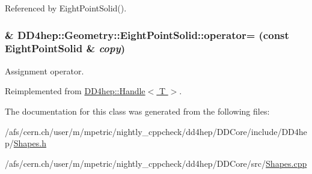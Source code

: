 Referenced by EightPointSolid().\hypertarget{class_d_d4hep_1_1_geometry_1_1_eight_point_solid_aa9fdc9420f5096e3075540a12b79cd2a}{
\subsubsection[{operator=}]{\& DD4hep::Geometry::EightPointSolid::operator= (const {\bf EightPointSolid} \& {\em copy})}}
\label{class_d_d4hep_1_1_geometry_1_1_eight_point_solid_aa9fdc9420f5096e3075540a12b79cd2a}


Assignment operator. 

Reimplemented from \hyperlink{class_d_d4hep_1_1_handle_a9bbf8f498df42e81ad26fb00233505a6}{DD4hep::Handle$<$ T $>$}.

The documentation for this class was generated from the following files:\begin{DoxyCompactItemize}
\item 
/afs/cern.ch/user/m/mpetric/nightly\_\-cppcheck/dd4hep/DDCore/include/DD4hep/\hyperlink{_shapes_8h}{Shapes.h}\item 
/afs/cern.ch/user/m/mpetric/nightly\_\-cppcheck/dd4hep/DDCore/src/\hyperlink{_shapes_8cpp}{Shapes.cpp}\end{DoxyCompactItemize}
